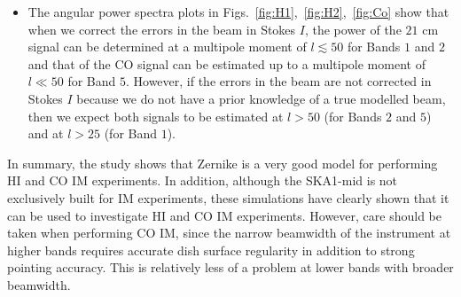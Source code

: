 \begin{itemize}
\item The angular power spectra plots in Figs.~\ref{fig:H1},~\ref{fig:H2},~\ref{fig:Co} show that when we correct the errors in the beam in Stokes $I$, the power of the $21$ cm signal can be determined at a multipole moment of $l \lesssim 50$ for Bands $1$ and $2$ and that of the CO signal can be estimated up to a multipole moment of $l \ll 50$ for Band $5$. However, if the errors in the beam are not corrected in Stokes $I$ because we do not have a prior knowledge of a true modelled beam, then we expect both signals to be estimated at  $l > 50$ (for  Bands $2$ and $5$) and at $l > 25$ (for Band $1$). %
\end{itemize}

\noindent  In summary, the study shows that Zernike is a very good model for performing HI and CO IM experiments. In addition, although the SKA1-mid is not exclusively built for IM experiments, these simulations have clearly shown that it can be used to investigate HI and CO IM experiments. However, care should be taken when performing CO IM, since the narrow beamwidth  of the instrument at higher bands requires accurate dish surface regularity in addition to strong pointing accuracy.  This is relatively less of a problem at lower bands with broader beamwidth.

%
